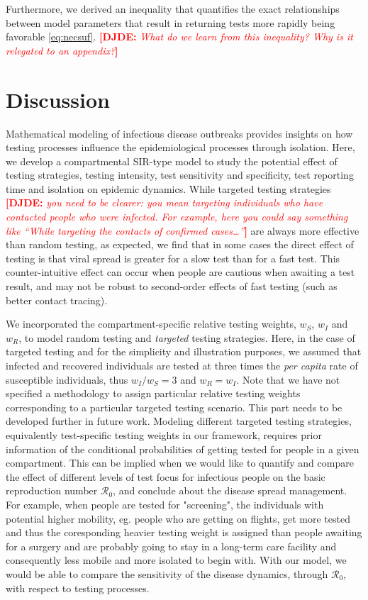 \documentclass[12pt]{article}
\newcommand{\percap}{\emph{per capita}\xspace}
\newcommand{\Rnum}{\ensuremath{\mathcal{R}_0}}
\DeclareRobustCommand\_{\ifmmode\expandafter\subtxt\else\textunderscore\fi}
\newcommand{\comment}{\showcomment}
\newcommand{\showcomment}[3]{\textcolor{#1}{\textbf{[#2: }\textsl{#3}\textbf{]}}}
\newcommand{\david}[1]{\comment{red}{DJDE}{#1}}
\theoremstyle{definition} %
\begin{document}
Furthermore, we derived an inequality that quantifies the exact relationships between model parameters that result in returning tests more rapidly being favorable \eqref{eq:necsuf}.
\david{What do we learn from this inequality?  Why is it relegated to an appendix?}

\section{Discussion}

Mathematical modeling of infectious disease outbreaks provides insights on how testing processes influence the epidemiological processes through isolation. 
Here, we develop a compartmental SIR-type model to study the potential effect of testing strategies, testing intensity, test sensitivity and specificity, test reporting time and isolation on epidemic dynamics. 
While targeted testing strategies 
\david{you need to be clearer: you mean targeting individuals who have contacted people who were infected.  For example, here you could say something like ``While targeting the contacts of confirmed cases\dots''}
are always more effective than random testing, as expected, we find that in some cases the direct effect of testing is that viral spread
is greater for a slow test than for a fast test. This counter-intuitive effect can occur when people are cautious when awaiting a test result, and may not be robust to second-order effects of fast testing (such as better contact tracing).

We incorporated the compartment-specific relative testing weights, $w_S$, $w_I$ and $w_R$, to model random testing and \emph{targeted} testing strategies. Here, in the case of targeted testing and for the simplicity and illustration purposes, we assumed that infected and recovered individuals are tested at three times the \percap rate of susceptible individuals, thus $w_I/w_S=3$ and $w_R=w_I$. Note that we have not specified a methodology to assign particular relative testing weights corresponding to a particular targeted testing scenario. 
This part needs to be developed further in future work. 
Modeling different targeted testing strategies, equivalently test-specific testing weights in our framework, requires prior information of the conditional probabilities of getting tested for people in a given compartment. 
This can be implied when we would like to quantify and compare the effect of different levels of test focus for infectious people on the basic reproduction number $\Rnum$, and conclude about the disease spread management. For example, when people are tested for "screening", the individuals with potential higher mobility, eg. people who are getting on flights, get more tested and thus the coresponding heavier testing weight is assigned than people awaiting for a surgery and are probably going to stay in a long-term care facility and consequently less mobile and more isolated to begin with. With our model, we would be able to compare the sensitivity of the disease dynamics, through $\Rnum$, with respect to testing processes.
\end{document}
